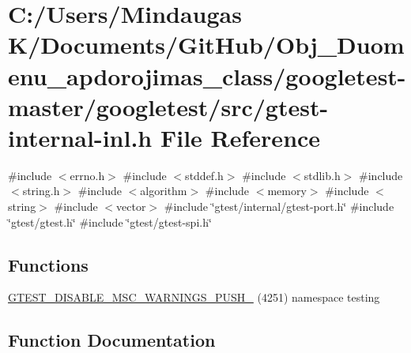 \hypertarget{googletest-master_2googletest_2src_2gtest-internal-inl_8h}{}\section{C\+:/\+Users/\+Mindaugas K/\+Documents/\+Git\+Hub/\+Obj\+\_\+\+Duomenu\+\_\+apdorojimas\+\_\+class/googletest-\/master/googletest/src/gtest-\/internal-\/inl.h File Reference}
\label{googletest-master_2googletest_2src_2gtest-internal-inl_8h}
{\ttfamily \#include $<$errno.\+h$>$}\newline
{\ttfamily \#include $<$stddef.\+h$>$}\newline
{\ttfamily \#include $<$stdlib.\+h$>$}\newline
{\ttfamily \#include $<$string.\+h$>$}\newline
{\ttfamily \#include $<$algorithm$>$}\newline
{\ttfamily \#include $<$memory$>$}\newline
{\ttfamily \#include $<$string$>$}\newline
{\ttfamily \#include $<$vector$>$}\newline
{\ttfamily \#include \char`\"{}gtest/internal/gtest-\/port.\+h\char`\"{}}\newline
{\ttfamily \#include \char`\"{}gtest/gtest.\+h\char`\"{}}\newline
{\ttfamily \#include \char`\"{}gtest/gtest-\/spi.\+h\char`\"{}}\newline
\subsection*{Functions}
\begin{DoxyCompactItemize}
\item 
\mbox{\hyperlink{googletest-master_2googletest_2src_2gtest-internal-inl_8h_a88f79832f9d045112a76e9da8611cc13}{G\+T\+E\+S\+T\+\_\+\+D\+I\+S\+A\+B\+L\+E\+\_\+\+M\+S\+C\+\_\+\+W\+A\+R\+N\+I\+N\+G\+S\+\_\+\+P\+U\+S\+H\+\_\+}} (4251) namespace testing
\end{DoxyCompactItemize}


\subsection{Function Documentation}
\mbox{\label{googletest-master_2googletest_2src_2gtest-internal-inl_8h_a88f79832f9d045112a76e9da8611cc13}} 
